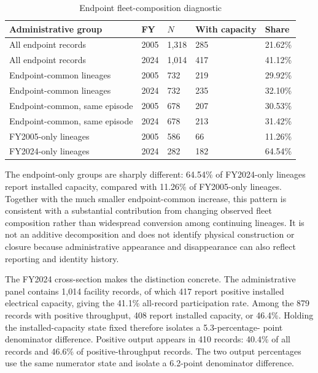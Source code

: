 \documentclass[12pt,letterpaper]{article}
\begin{document}
\begin{table}[!htbp]
\centering
\caption{Endpoint fleet-composition diagnostic}
\label{tab:endpoint-composition}
\small
\setlength{\tabcolsep}{4pt}
\renewcommand{\arraystretch}{1.08}
\begin{tabularx}{\textwidth}{Y R{0.9cm} R{1.25cm} R{1.65cm} R{1.2cm}}
\toprule
Administrative group & FY & $N$ & With capacity & Share \\
\midrule
All endpoint records & 2005 & 1,318 & 285 & 21.62\% \\
All endpoint records & 2024 & 1,014 & 417 & 41.12\% \\
Endpoint-common lineages & 2005 & 732 & 219 & 29.92\% \\
Endpoint-common lineages & 2024 & 732 & 235 & 32.10\% \\
Endpoint-common, same episode & 2005 & 678 & 207 & 30.53\% \\
Endpoint-common, same episode & 2024 & 678 & 213 & 31.42\% \\
FY2005-only lineages & 2005 & 586 & 66 & 11.26\% \\
FY2024-only lineages & 2024 & 282 & 182 & 64.54\% \\
\bottomrule
\end{tabularx}
\renewcommand{\arraystretch}{1}
\normalsize
\end{table}

The endpoint-only groups are sharply different: 64.54\% of FY2024-only
lineages report installed capacity, compared with 11.26\% of FY2005-only
lineages. Together with the much smaller endpoint-common increase, this pattern
is consistent with a substantial contribution from changing observed fleet
composition rather than widespread conversion among continuing lineages. It is
not an additive decomposition and does not identify physical construction or closure because
administrative appearance and disappearance can also reflect reporting and
identity history.

The FY2024 cross-section makes the distinction concrete. The administrative
panel contains 1,014 facility records, of which 417 report positive installed
electrical capacity, giving the 41.1\% all-record participation rate. Among the
879 records with positive throughput, 408 report installed capacity, or 46.4\%.
Holding the installed-capacity state fixed therefore isolates a 5.3-percentage-
point denominator difference. Positive output appears in 410 records: 40.4\% of
all records and 46.6\% of positive-throughput records. The two output percentages
use the same numerator state and isolate a 6.2-point denominator difference.
\end{document}
